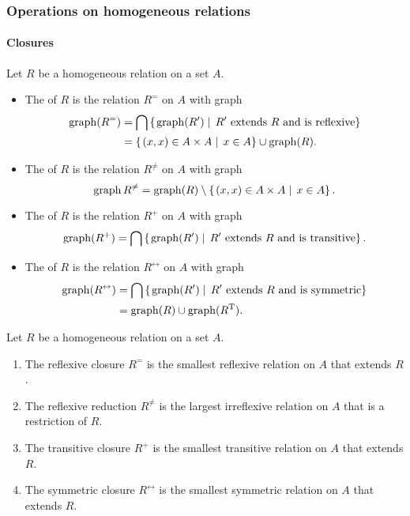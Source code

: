 \subsubsection{Operations on homogeneous relations}
\paragraph{Closures}
\begin{definition}
Let $R$ be a homogeneous relation on a set $A$.
\begin{itemize}
\item The  of $R$ is the relation $R^=$ on $A$ with graph
\begin{align*}
\operatorname{graph}(R^=) &= \bigcap\left\{\left. \operatorname{graph}(R') \;\right|\; \text{$R'$ extends $R$ and is reflexive} \right\} \\
&= \left\{\left. (x,x)\in A\times A \;\right|\; x\in A \right\}\cup \operatorname{graph}(R).
\end{align*}
\item The  of $R$ is the relation $R^{\neq}$ on $A$ with graph
\[ \operatorname{graph}{R^{\neq}} = \operatorname{graph}(R)\setminus \left\{\left. (x,x)\in A\times A \;\right|\; x \in A \right\}. \]
\item The  of $R$ is the relation $R^{+}$ on $A$ with graph
\[ \operatorname{graph}(R^+) = \bigcap\left\{\left. \operatorname{graph}(R') \;\right|\; \text{$R'$ extends $R$ and is transitive} \right\}. \]
\item The  of $R$ is the relation $R^{\leftrightarrow}$ on $A$ with graph
\begin{align*}
\operatorname{graph}(R^\leftrightarrow) &= \bigcap\left\{\left. \operatorname{graph}(R') \;\right|\; \text{$R'$ extends $R$ and is symmetric} \right\} \\
&=  \operatorname{graph}(R)\cup \operatorname{graph}(R^{\mathrm{T}}).
\end{align*}
\end{itemize}
\end{definition}

\begin{lemma}
Let $R$ be a homogeneous relation on a set $A$.
\begin{enumerate}
\item The reflexive closure $R^=$ is the smallest reflexive relation on $A$ that extends $R$.
\item The reflexive reduction $R^{\neq}$ is the largest irreflexive relation on $A$ that is a restriction of $R$.
\item The transitive closure $R^{+}$ is the smallest transitive relation on $A$ that extends $R$.
\item The symmetric closure $R^{\leftrightarrow}$ is the smallest symmetric relation on $A$ that extends $R$.
\end{enumerate}
\end{lemma}

